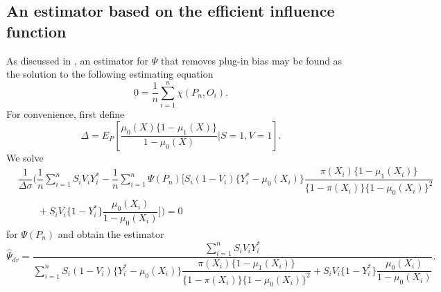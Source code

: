 


\subsection{An estimator based on the efficient influence function}
As discussed in \textcite{hines_demystifying_2022}, an estimator for $\Psi$ that removes plug-in bias may be found as the solution to the following estimating equation 
\begin{equation*}
    0 = \dfrac{1}{n} \sum_{i=1}^n \chi(P_n, O_i).
\end{equation*}
For convenience, first define 
\begin{equation*}
    \Delta = E_P\left[\dfrac{\mu_0(X)\{1 - \mu_1(X)\}}{1 - \mu_0(X)} \bigg| S=1, V=1\right].
\end{equation*}
We solve 
\begin{align*}
    &\dfrac{1}{\Delta \sigma} \bigg(\dfrac{1}{n} \sum_{i=1}^n  S_i V_i Y_i^* - \dfrac{1}{n} \sum_{i=1}^n \Psi(P_n) \bigg[  S_i (1 - V_i)\{Y_i^* - \mu_0(X_i)\}\dfrac{\pi(X_i)\{1 - \mu_1(X_i)\}}{\{1 - \pi(X_i)\}\{1 - \mu_0(X_i)\}^2} \\
    &\qquad +  S_i V_i\{1-Y_i^*\}\dfrac{\mu_0(X_i)}{1 - \mu_0(X_i)}\bigg]\bigg) = 0
\end{align*}
for $\Psi(P_n)$ and obtain the estimator
\begin{equation*}
    \widehat{\Psi}_{dr} = \dfrac{\sum_{i=1}^n   S_i V_i Y_i^*}{\sum_{i=1}^n S_i (1 - V_i)\{Y_i^* - \mu_0(X_i)\}\dfrac{\pi(X_i)\{1 - \mu_1(X_i)\}}{\{1 - \pi(X_i)\}\{1 - \mu_0(X_i)\}^2} +  S_i V_i\{1-Y_i^*\}\dfrac{\mu_0(X_i)}{1 - \mu_0(X_i)}}.
\end{equation*}

